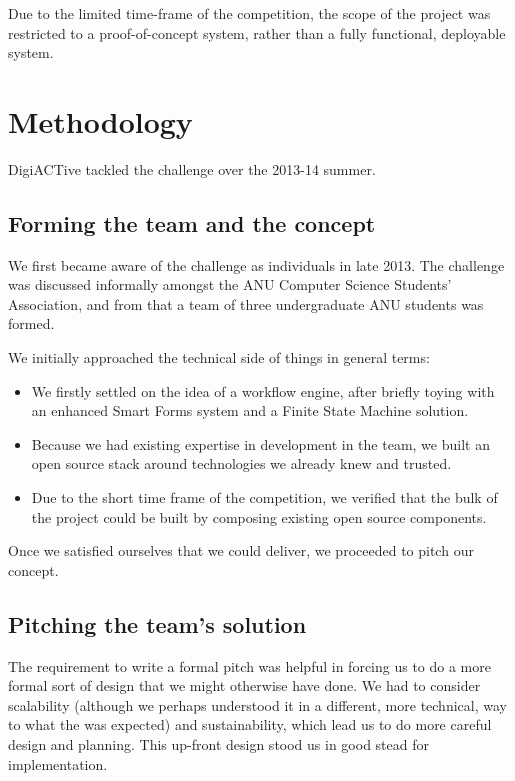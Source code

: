 \documentclass[12pt,a4paper,twosided]{article}
\begin{document}
Due to the limited time-frame of the competition, the scope of the project was restricted to a proof-of-concept system, rather than a fully functional, deployable system.


\newpage
\section{Methodology}

DigiACTive tackled the challenge over the 2013-14 summer.

\subsection{Forming the team and the concept}

We first became aware of the challenge as individuals in late 2013. The
challenge was discussed informally amongst the ANU Computer Science
Students' Association, and from that a team of three undergraduate ANU students was formed.

We initially approached the technical side of things in general terms:

\begin{itemize}

\item
  We firstly settled on the idea of a workflow engine, after briefly
  toying with an enhanced Smart Forms system and a Finite State Machine
  solution.
\item
  Because we had existing expertise in development in the team, we built
  an open source stack around technologies we already knew and
  trusted.
\item
  Due to the short time frame of the competition, we verified that the
  bulk of the project could be built by composing existing open source
  components.
\end{itemize}

Once we satisfied ourselves that we could deliver, we proceeded to pitch
our concept.

\subsection{Pitching the team's solution}

The requirement to write a formal pitch was helpful in forcing us to do
a more formal sort of design that we might otherwise have done. We had
to consider scalability (although we perhaps understood it in a
different, more technical, way to what the was expected) and
sustainability, which lead us to do more careful design and planning.
This up-front design stood us in good stead for implementation.
\end{document}
